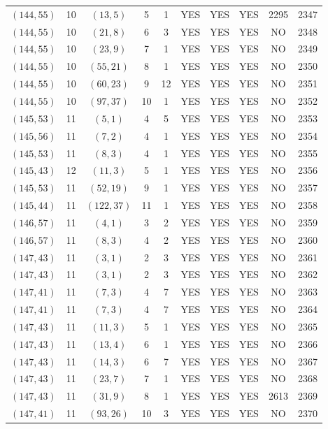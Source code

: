 \begin{longtable}{|c|c|c|c|c|c|c|c|c|c|}
$(144, 55)$ & 10 & $(13, 5)$ & 5 & 1 & YES & YES & YES & 2295 & 2347\\
$(144, 55)$ & 10 & $(21, 8)$ & 6 & 3 & YES & YES & YES & NO & 2348\\
$(144, 55)$ & 10 & $(23, 9)$ & 7 & 1 & YES & YES & YES & NO & 2349\\
$(144, 55)$ & 10 & $(55, 21)$ & 8 & 1 & YES & YES & YES & NO & 2350\\
$(144, 55)$ & 10 & $(60, 23)$ & 9 & 12 & YES & YES & YES & NO & 2351\\
$(144, 55)$ & 10 & $(97, 37)$ & 10 & 1 & YES & YES & YES & NO & 2352\\
$(145, 53)$ & 11 & $(5, 1)$ & 4 & 5 & YES & YES & YES & NO & 2353\\
$(145, 56)$ & 11 & $(7, 2)$ & 4 & 1 & YES & YES & YES & NO & 2354\\
$(145, 53)$ & 11 & $(8, 3)$ & 4 & 1 & YES & YES & YES & NO & 2355\\
$(145, 43)$ & 12 & $(11, 3)$ & 5 & 1 & YES & YES & YES & NO & 2356\\
$(145, 53)$ & 11 & $(52, 19)$ & 9 & 1 & YES & YES & YES & NO & 2357\\
$(145, 44)$ & 11 & $(122, 37)$ & 11 & 1 & YES & YES & YES & NO & 2358\\
$(146, 57)$ & 11 & $(4, 1)$ & 3 & 2 & YES & YES & YES & NO & 2359\\
$(146, 57)$ & 11 & $(8, 3)$ & 4 & 2 & YES & YES & YES & NO & 2360\\
$(147, 43)$ & 11 & $(3, 1)$ & 2 & 3 & YES & YES & YES & NO & 2361\\
$(147, 43)$ & 11 & $(3, 1)$ & 2 & 3 & YES & YES & YES & NO & 2362\\
$(147, 41)$ & 11 & $(7, 3)$ & 4 & 7 & YES & YES & YES & NO & 2363\\
$(147, 41)$ & 11 & $(7, 3)$ & 4 & 7 & YES & YES & YES & NO & 2364\\
$(147, 43)$ & 11 & $(11, 3)$ & 5 & 1 & YES & YES & YES & NO & 2365\\
$(147, 43)$ & 11 & $(13, 4)$ & 6 & 1 & YES & YES & YES & NO & 2366\\
$(147, 43)$ & 11 & $(14, 3)$ & 6 & 7 & YES & YES & YES & NO & 2367\\
$(147, 43)$ & 11 & $(23, 7)$ & 7 & 1 & YES & YES & YES & NO & 2368\\
$(147, 43)$ & 11 & $(31, 9)$ & 8 & 1 & YES & YES & YES & 2613 & 2369\\
$(147, 41)$ & 11 & $(93, 26)$ & 10 & 3 & YES & YES & YES & NO & 2370\\

\end{longtable}
